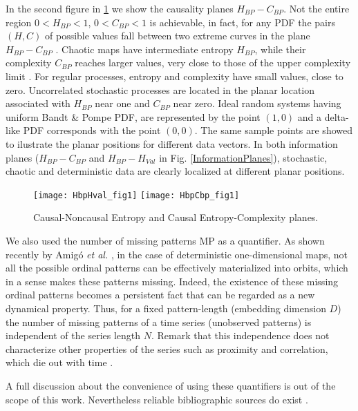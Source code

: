 In the second figure in \ref{fig:InformationPlanes} we show the causality planes $H_{BP}-C_{BP}$.
Not the entire region $0<H_{BP}<1$, $0<C_{BP}<1$ is achievable, in fact, for any PDF the pairs $(H,C)$ of possible values fall between two extreme curves in the plane $H_{BP}-C_{BP}$ \cite{Anteneodo1996}.
Chaotic maps have intermediate entropy $H_{BP}$, while their complexity $C_{BP}$ reaches larger values, very close to those of the upper complexity limit \cite{Rosso2007,Olivares2012B}.
For regular processes, entropy and complexity have small values, close to zero. 
Uncorrelated stochastic processes are located in the planar location associated with $H_{BP}$ near one and $C_{BP}$ near zero.
Ideal random systems having uniform Bandt \& Pompe PDF, are represented by the point $(1,0)$ \cite{Gonzalez2005} and a delta-like PDF corresponds with the point $(0,0)$.
The same sample points are showed to ilustrate the planar positions for different data vectors.
In both information planes ($H_{BP}-C_{BP}$ and $H_{BP}-H_{Val}$ in Fig. \ref{InformationPlanes}), stochastic, chaotic and deterministic data are clearly localized at different planar positions. 


\begin{figure}
	\centering	
	\texttt{[image: HbpHval\_fig1]}
	\texttt{[image: HbpCbp\_fig1]}
	\caption{Causal-Noncausal Entropy and Causal Entropy-Complexity planes.}
	\label{fig:InformationPlanes}
\end{figure}

We also used the number of missing patterns MP as a quantifier\cite{Rosso2012}.
As shown recently by Amig\'o {\it et al.} \cite{Amigo2006,Amigo2007,Amigo2008,Amigo2010}, in the case of deterministic one-dimensional maps, not all the possible ordinal patterns can be effectively materialized into orbits, which in a sense makes these patterns missing.
Indeed, the existence of these missing ordinal patterns becomes a persistent fact that can be regarded as a new dynamical property.
Thus, for a fixed pattern-length (embedding dimension $D$) the number of missing patterns of a time series (unobserved patterns) is independent of the series length $N$.
Remark that this independence does not characterize other properties of the series such as proximity and correlation, which die out with time \cite{Amigo2007,Amigo2010}.

A full discussion about the convenience of using these quantifiers is out of the scope of this work.
Nevertheless reliable bibliographic sources do exist \cite{Wackerbauer1994,Lopez-Ruiz1995,Rosso2007A,DeMicco2008,Rosso2010,Martin2006,Rosso2012}.


